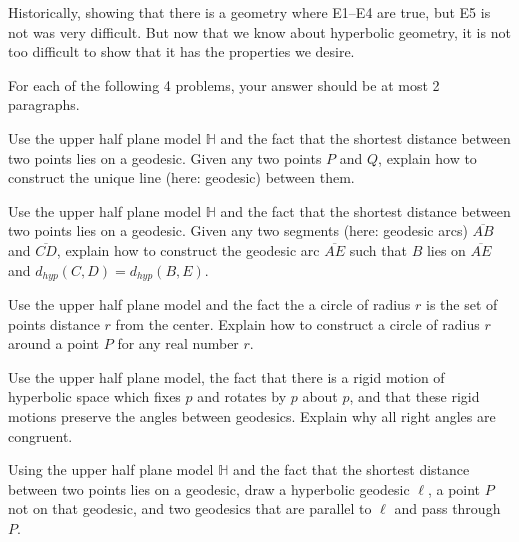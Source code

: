 \documentclass[newpage,hints,handout]{ximera}
\begin{document}
Historically, showing that there is a geometry where E1--E4 are true, but E5 is not was very difficult. But now that we know about hyperbolic geometry, it is not too difficult to show that it has the properties we desire.

For each of the following 4 problems, your answer should be at most 2 paragraphs.

\begin{problem}
 Use the upper half plane model $\mathbb{H}$ and the fact that the shortest distance between two points lies on a geodesic. Given any two points $P$ and $Q$, explain how to construct the unique line (here: geodesic) between them. 
\end{problem}

\begin{problem}
 Use the upper half plane model $\mathbb{H}$ and the fact that the shortest distance between two points lies on a geodesic. Given any two segments (here: geodesic arcs) $\overline{AB}$ and $\overline{CD}$, explain how to construct the geodesic arc $\overline{AE}$  such that $B$ lies on $\overline{AE}$ and $d_{hyp}(C,D)=d_{hyp}(B,E)$. 
\end{problem}

\begin{problem}
 Use the upper half plane model and the fact the a circle of radius $r$ is the set of points distance $r$ from the center. Explain how to construct a circle of radius $r$ around a point $P$ for any real number $r$.
\end{problem}

\begin{problem}
 Use the upper half plane model, the fact that there is a rigid motion of hyperbolic space which fixes $p$ and rotates by $p$
about $p$, and that these rigid motions preserve the angles between geodesics. Explain why all right angles are congruent.
\end{problem}

\begin{problem}
 Using the upper half plane model $\mathbb{H}$ and the fact that the shortest distance between two points lies on a geodesic, draw a hyperbolic geodesic  $\ell$, a point $P$ not on that geodesic, and two geodesics that are parallel to $\ell$ and pass through $P$.
\end{problem}
\end{document}

